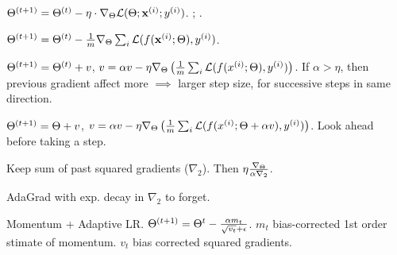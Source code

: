 \begin{definition}[SGD]
    \(\Theta^{(t+1)} = \Theta^{(t)} - \eta \cdot \nabla_\Theta \mathcal{L}(\Theta; \vb{x}^{(i)}; y^{(i)})\).
    ;
    .
\end{definition}

\begin{definition}[MB-GD]
    \(\Theta^{(t+1)} = \Theta^{(t)} - \frac 1 m \nabla_\Theta \sum_i \mathcal{L}(f(\vb{x}^{(i)}; \Theta), y^{(i)})\).
\end{definition}

\begin{definition}
    \(\Theta^{(t+1)} = \Theta^{(t)} + v\), \(v = \alpha v - \eta \nabla_\Theta\left(\frac 1 m \sum_i \mathcal{L}(f(x^{(i)}; \Theta), y^{(i)})\right)\). If \(\alpha > \eta\), then previous gradient affect more \(\implies\) larger step size, for successive steps in same direction.
\end{definition}

\begin{definition}
    \(\Theta^{(t+1)} = \Theta + v\), \(v = \alpha v - \eta \nabla_\Theta\left(\frac 1 m \sum_i \mathcal{L}(f(x^{(i)}; \Theta + \alpha v), y^{(i)})\right)\). Look ahead before taking a step.
\end{definition}

\begin{definition}[AdaGrad]
    Keep sum of past squared gradients (\(\nabla_2\)). Then \(\eta \frac{\nabla_\Theta}{\alpha \nabla_2} \).
\end{definition}

\begin{definition}[RMSprop]
    AdaGrad with exp. decay in \(\nabla_2\) to forget. 
\end{definition}

\begin{definition}[Adam]
    Momentum + Adaptive LR. \(\Theta^{(t+1)} = \Theta^t - \frac{\alpha m_t}{\sqrt{v_t} + \epsilon}\). \(m_t\) bias-corrected 1st order stimate of momentum. \(v_t\) bias corrected squared gradients.
\end{definition}


